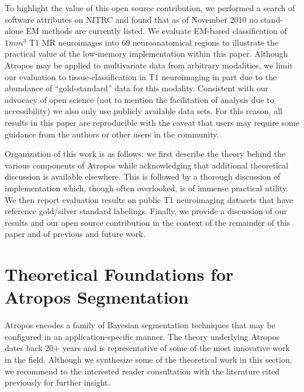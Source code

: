 \documentclass[11pt,english]{article}
\begin{document}
To highlight the
value of this open source contribution, we performed a search of
software attributes on NITRC and found that as of November 2010 no
stand-alone EM methods are currently listed.
We evaluate EM-based classification of $1 mm^3$ T1 MR
neuroimages into 69 neuroanatomical regions to illustrate the practical
value of the low-memory implementation within this paper.  
Although Atropos may be applied to
multivariate data from arbitrary modalities, we limit our evaluation
to tissue-classification in T1 neuroimaging in part due to the
abundance of ``gold-standard'' data for this modality.  Consistent
with our advocacy of open science (not to mention the facilitation of
analysis due to accessibility) we also only use publicly available
data sets.  For this reason, all results in this paper are
reproducible with the caveat that users may require some guidance from
the authors or other users in the community.

Organization of this work is as follows: we first describe the theory
behind the various components of Atropos while
acknowledging that additional theoretical discussion is available elsewhere.  
This is followed by a thorough
discussion of implementation which, though often overlooked, is of
immense practical utility.  We then report evaluation results on
public T1 neuroimaging datasets that have reference gold/silver
standard labelings.  Finally, we provide a discussion of our results
and our open source contribution in the context of the remainder of
this paper and of previous and future work.

\section{Theoretical Foundations for Atropos Segmentation} 

Atropos encodes a family of Bayesian segmentation techniques that may be configured in an application-specific manner.  The theory underlying Atropos dates back 20$+$ years and is representative of some of the most innovative work in the field.  Although we synthesize some of the theoretical work in this section, we recommend to the interested reader consultation with the literature cited previously for further insight.
\end{document}
